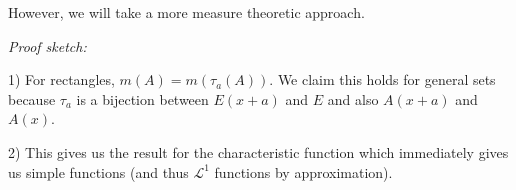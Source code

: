 \documentclass[12pt]{report}
\newcommand{\R}{\mathbb{R}}
\newcommand{\C}{\mathbb{C}}
\renewcommand{\L}{\mathcal{L}}
\newenvironment*{tbox}[2][gray]{
    \begin{tcolorbox}[
        parbox=false,
        colback=#1!5!white,
        colframe=#1!75!black,
        breakable,
        title={#2}
    ]}
    {\end{tcolorbox}}
\begin{document}
    However, we will take a more measure theoretic approach. 

    \begin{tbox}{\textbf{Theorem (Translation Invariance):} Let $\tau_a(x) = x + a$ for $a \in \R^n$. Then,
        \begin{enumerate}
            \item $m(\tau_a(E)) = m(E)$
            \item If $f: \R^n \to \C$ is either $\geq 0$ or in $\L^1$, 
            \[\int f(x + a)\; d\mu= \int f\; d\mu \]
        \end{enumerate}}
        \emph{Proof sketch:} 
        
        1) For rectangles, $m(A) = m(\tau_a(A))$. We claim this holds for general sets because $\tau_a$ is a bijection between $E(x + a)$ and $E$ and also $A(x + a)$ and $A(x)$.
        
        2) This gives us the result for the characteristic function which immediately gives us simple functions (and thus $\L^1$ functions by approximation).

    \end{tbox}
\end{document}
